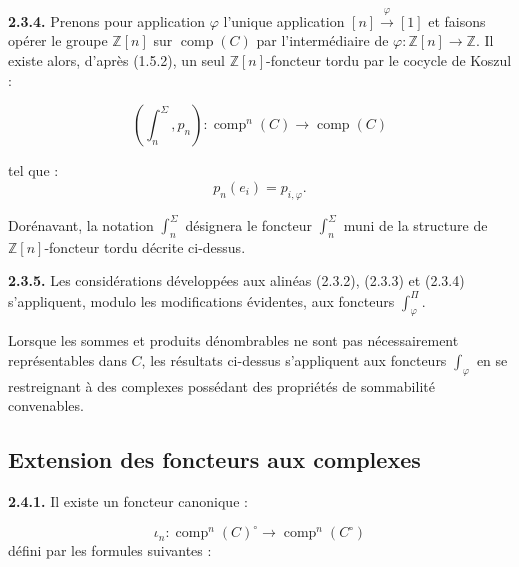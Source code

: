 %
\noindent\textbf{2.3.4.}\quad
Prenons pour application $\varphi$ l'unique application
$[n]\xrightarrow{\varphi}[1]$ et faisons opérer le groupe $\mathbb Z[n]$
sur $\operatorname{comp}(C)$ par l'intermédiaire de
$\varphi\colon\mathbb Z[n]\longrightarrow\mathbb Z$. Il existe alors,
d'après (1.5.2), un seul $\mathbb Z[n]$-foncteur tordu par le cocycle de
Koszul :

\begin{equation}
  \left(\int_n^\Sigma,p_n\right)\colon
  \operatorname{comp}^{n}(C)\longrightarrow\operatorname{comp}(C)
  \tag{2.3.4.1}
\end{equation}

tel que :
\begin{equation*}
  p_n(e_i)=p_{i,\varphi}.
\end{equation*}

Dorénavant, la notation $\int_n^\Sigma$ désignera le foncteur
$\int_n^\Sigma$ muni de la structure de $\mathbb Z[n]$-foncteur tordu
décrite ci-dessus.

\noindent\textbf{2.3.5.}\quad
Les considérations développées aux alinéas (2.3.2), (2.3.3) et (2.3.4)
s'appliquent, modulo les modifications évidentes, aux foncteurs
$\int_\varphi^\Pi$.

Lorsque les sommes et produits dénombrables ne sont pas nécessairement
représentables dans $C$, les résultats ci-dessus s'appliquent aux foncteurs
$\int_\varphi$ en se restreignant à des complexes possédant des propriétés
de sommabilité convenables.

\subsection{Extension des foncteurs aux complexes}

\noindent\textbf{2.4.1.}\quad
Il existe un foncteur canonique :

\begin{equation}
  \iota_n\colon
  \operatorname{comp}^{n}(C)^\circ
  \longrightarrow
  \operatorname{comp}^{n}(C^\circ)
  \tag{2.4.1.1}
\end{equation}
défini par les formules suivantes :

